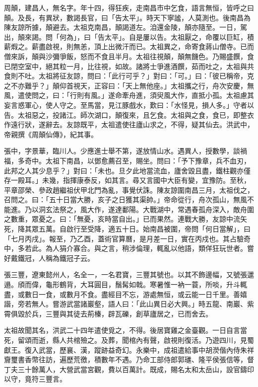 \begin{pinyinscope}
周顛，建昌人，無名字。年十四，得狂疾，走南昌市中乞食，語言無恒，皆呼之曰顛。及長，有異狀，數謁長官，曰「告太平」。時天下寧謐，人莫測也。後南昌為陳友諒所據，顛避去。太祖克南昌，顛謁道左。洎還金陵，顛亦隨至。一日，駕出，顛來謁。問「何為」，曰「告太平」。自是屢以告。太祖厭之，命覆以巨缸，積薪煆之。薪盡啟視，則無恙，頂上出微汗而已。太祖異之，命寄食蔣山僧寺。已而僧來訴，顛與沙彌爭飯，怒而不食且半月。太祖往視顛，顛無饑色。乃賜盛饌，食已閉空室中，絕其粒一月，比往視，如故。諸將士爭進酒饌，茹而吐之，太祖與共食則不吐。太祖將征友諒，問曰：「此行可乎？」對曰：「可。」曰：「彼已稱帝，克之不亦難乎？」顛仰首視天，正容曰：「天上無他座。」太祖攜之行，舟次安慶，無風，遣使問之，曰：「行則有風。」遂命牽舟進，須臾風大作，直抵小孤。太祖慮其妄言惑軍心，使人守之。至馬當，見江豚戲水，歎曰：「水怪見，損人多。」守者以告。太祖惡之，投諸江。師次湖口，顛復來，且乞食。太祖與之食，食已，即整衣作遠行狀，遂辭去。友諒既平，太祖遣使往廬山求之，不得，疑其仙去。洪武中，帝親撰《周顛仙傳》，紀其事。

張中，字景華，臨川人。少應進士舉不第，遂放情山水。遇異人，授數學，談禍福，多奇中。太祖下南昌，以鄧愈薦召至，賜坐。問曰：「予下豫章，兵不血刃，此邦之人其少息乎？」對曰：「未也。旦夕此地當流血，廬舍毀且盡，鐵柱觀亦僅存一殿耳。」未幾，指揮康泰反，如其言。尋又言國中大臣有變，宜豫防。至秋，平章邵榮、參政趙繼祖伏甲北門為亂，事覺伏誅。陳友諒圍南昌三月，太祖伐之，召問之。曰：「五十日當大勝，亥子之日獲其渠帥。」帝命從行，舟次孤山，無風不能進。乃以洞玄法祭之，風大作，遂達鄱陽。大戰湖中，常遇春孤舟深入，敵舟圍之數重，眾憂之。曰：「無憂，亥時當自出。」已而果然。連戰大勝，友諒中流矢死，降其眾五萬。自啟行至受降，適五十日。始南昌被圍，帝問「何日當解」，曰「七月丙戌」。報至，乃乙酉，蓋術官算曆，是月差一日，實在丙戍也。其占驗奇中，多若此。為人狷介寡合。與之言，稍涉倫理，輒亂以他語，類佯狂玩世者。嘗好戴鐵冠，人稱為鐵冠子云。

張三豐，遼東懿州人，名全一，一名君寶，三豐其號也。以其不飾邊幅，又號張邋遢。頎而偉，龜形鶴背，大耳圓目，鬚髯如戟。寒暑惟一衲一蓑，所啖，升斗輒盡，或數日一食，或數月不食。盡經目不忘，游處無恒，或云能一日千里。善嬉諧，旁若無人。嘗游武當諸巖壑，語人曰：「此山異日必大興。」時五龍、南巖、紫霄俱毀於兵，三豐與其徒去荊榛，辟瓦礫，創草廬居之，已而舍去。

太祖故聞其名，洪武二十四年遣使覓之，不得。後居寶雞之金臺觀。一日自言當死，留頌而逝，縣人共棺殮之。及葬，聞棺內有聲，啟視則復活。乃遊四川，見蜀獻王。復入武當，歷襄、漢，蹤跡益奇幻。永樂中，成祖遣給事中胡濙偕內侍朱祥齎璽書香幣往訪，遍歷荒徼，積數年不遇。乃命工部侍郎郭璡、隆平侯張信等，督丁夫三十餘萬人，大營武當宮觀，費以百萬計。既成，賜名太和太岳山，設官鑄印以守，竟符三豐言。


\end{pinyinscope}
